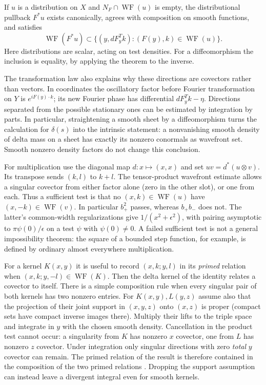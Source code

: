 \begin{theorem}
\label{f:wf-pullback}
If $u$ is a distribution on $X$ and $N_F\cap\operatorname{WF}(u)$ is
empty, the distributional pullback $F^*u$ exists canonically, agrees
with composition on smooth functions, and satisfies
\[
 \operatorname{WF}(F^*u)\subset
 \{(y,dF_y^Tk):(F(y),k)\in\operatorname{WF}(u)\}.
\]
Here distributions are scalar, acting on test densities. For a
diffeomorphism the inclusion is equality, by applying the theorem to
the inverse.
\end{theorem}

The transformation law also explains why these directions are covectors
rather than vectors. In coordinates the oscillatory factor before Fourier
transformation on $Y$ is $e^{i F(y)\cdot k}$; its new Fourier phase has
differential $dF_y^Tk-\eta$. Directions separated from the possible
stationary ones can be estimated by integration by parts. In particular,
straightening a smooth sheet by a diffeomorphism turns the calculation for
$\delta(s)$ into the intrinsic statement: a nonvanishing smooth density
of delta mass on a sheet has exactly its nonzero conormals as wavefront
set. Smooth nonzero density factors do not change this conclusion.

For multiplication use the diagonal map $d:x\mapsto(x,x)$ and set
$uv=d^*(u\otimes v)$. Its transpose sends $(k,l)$ to $k+l$.
The tensor-product wavefront estimate allows a singular covector from
either factor alone (zero in the other slot), or one from each. Thus a
sufficient test is that no $(x,k)\in\operatorname{WF}(u)$ have
$(x,-k)\in\operatorname{WF}(v)$. In particular $b_+^2$ passes, whereas
$b_+b_-$ does not. The latter's common-width regularizations give
$1/(x^2+\epsilon^2)$, with pairing asymptotic to
$\pi\psi(0)/\epsilon$ on a test $\psi$ with $\psi(0)\ne0$. A failed
sufficient test is not a general impossibility theorem: the square of a
bounded step function, for example, is defined by ordinary almost
everywhere multiplication.

For a kernel $K(x,y)$ it is useful to record $(x,k;y,l)$ in its
\emph{primed} relation when $(x,k;y,-l)\in\operatorname{WF}(K)$. Then the
delta kernel of the identity relates a covector to itself. There is a
simple composition rule when every singular pair of both kernels has two
nonzero entries. For $K(x,y),L(y,z)$ assume also that the projection of
their joint support in $(x,y,z)$ onto $(x,z)$ is proper (compact sets
have compact inverse images there). Multiply their lifts to the triple
space and integrate in $y$ with the chosen smooth density. Cancellation in
the product test cannot occur: a singularity from $K$ has nonzero $x$
covector, one from $L$ has nonzero $z$ covector. Under integration only
singular directions with zero \emph{total} $y$ covector can remain. The
primed relation of the result is therefore contained in the composition
of the two primed relations \cite{HormI}. Dropping the support assumption
can instead leave a divergent integral even for smooth kernels.


